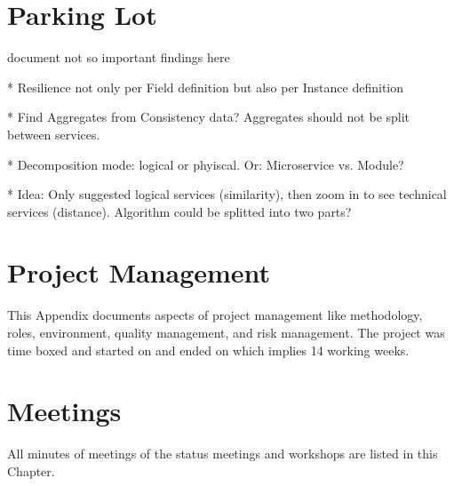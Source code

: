 \documentclass[hsr-ba,english]{hgbthesis}
\begin{document}
\chapter{Parking Lot}
document not so important findings here	

* Resilience not only per Field definition but also per Instance definition 

* Find Aggregates from Consistency data? Aggregates should not be split between services.

* Decomposition mode: logical or phyiscal. Or: Microservice vs. Module?

* Idea: Only suggested logical services (similarity), then zoom in to see technical services (distance). Algorithm could be splitted into two parts?






\chapter{Project Management}
\label{cha:projectmgmt}

This Appendix documents aspects of project management like methodology, roles, environment, quality management, and risk management. The project was time boxed and started on  and ended on  which implies 14 working weeks. 







\chapter{Meetings}

All minutes of meetings of the status meetings and workshops are listed in this Chapter.






%
%



\printglossaries


\MakeBibliography
\end{document}

